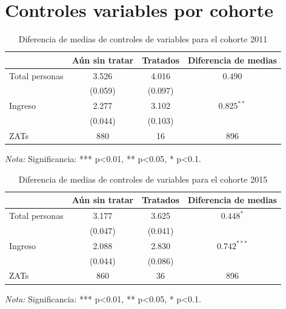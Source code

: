 \documentclass{article}
\begin{document}
\section{Controles variables por cohorte}
\label{sec:controles_variables}

\begin{table} [H]
  \centering
  \caption{Diferencia de medias de controles de variables para el cohorte 2011}
  \label{tab:balance_2011}
  \begin{tabular}{l c c c}
    \toprule
    & \textbf{Aún sin tratar} & \textbf{Tratados} & \textbf{Diferencia de medias} \\
    \midrule
    Total personas & 3.526 & 4.016 & $0.490$ \\
    & (0.059) & (0.097) & \\
    Ingreso & 2.277 & 3.102 & $0.825^{**}$ \\
    & (0.044) & (0.103) & \\
    \midrule
    ZATs & 880 & 16 & 896 \\
    \bottomrule
  \end{tabular}
  \vspace{0.2cm}
  
\parbox[t]{\textwidth}{%
    \vspace{0.5em}
    \footnotesize{ \textit{Nota:} Significancia: *** p<0.01, ** p<0.05, * p<0.1.}}
  
\end{table}

\begin{table} [H]
  \centering
  \caption{Diferencia de medias de controles de variables para el cohorte 2015}
  \label{tab:balance_2015}
  \begin{tabular}{l c c c}
    \toprule
    & \textbf{Aún sin tratar} & \textbf{Tratados} & \textbf{Diferencia de medias} \\
    \midrule
    Total personas & 3.177 & 3.625 & $0.448^{*}$ \\
    & (0.047) & (0.041) & \\
    Ingreso & 2.088 & 2.830 & $0.742^{***}$ \\
    & (0.044) & (0.086) & \\
    \midrule
    ZATs & 860 & 36 & 896 \\
    \bottomrule
  \end{tabular}
  
\parbox[t]{\textwidth}{%
    \vspace{0.5em}
    \footnotesize{ \textit{Nota:} Significancia: *** p<0.01, ** p<0.05, * p<0.1.}}
  
\end{table}
\end{document}
